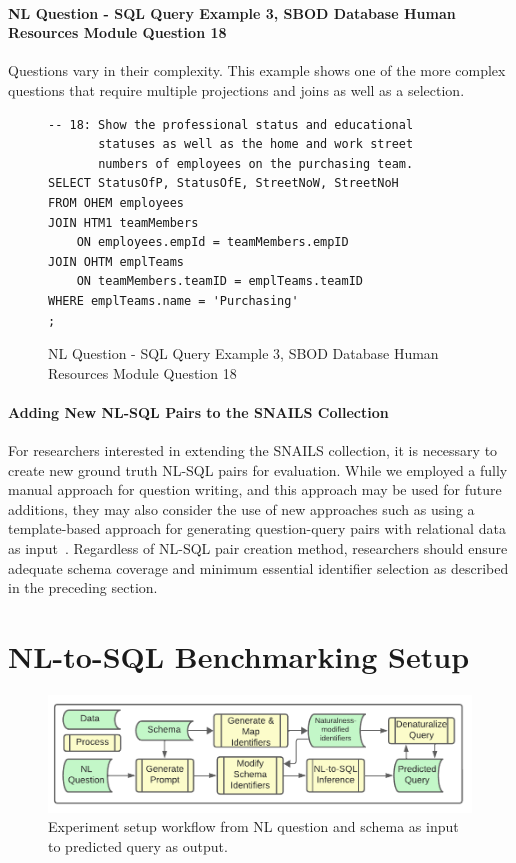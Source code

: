 \paragraph{NL Question - SQL Query Example 3, SBOD Database Human Resources Module Question 18}
Questions vary in their complexity.
This example shows one of the more complex questions that require multiple projections and joins as well as a selection.

\begin{figure}[H]
\begin{Verbatim}[frame=single,fillcolor=\color{lightgray}]
-- 18: Show the professional status and educational 
       statuses as well as the home and work street 
       numbers of employees on the purchasing team.
SELECT StatusOfP, StatusOfE, StreetNoW, StreetNoH
FROM OHEM employees
JOIN HTM1 teamMembers 
    ON employees.empId = teamMembers.empID
JOIN OHTM emplTeams 
    ON teamMembers.teamID = emplTeams.teamID
WHERE emplTeams.name = 'Purchasing'
;
\end{Verbatim}
\caption{NL Question - SQL Query Example 3, SBOD Database Human Resources Module Question 18}
\end{figure}


\paragraph{\textbf{Adding New NL-SQL Pairs to the SNAILS Collection}}
For researchers interested in extending the SNAILS collection, it is necessary to create new ground truth NL-SQL pairs for evaluation. 
While we employed a fully manual approach for question writing, and this approach may be used for future additions, they may also consider the use of new approaches such as using a template-based approach for generating question-query pairs with relational data as input~\cite{10.5555/3666122.3667470}.
Regardless of NL-SQL pair creation method, researchers should ensure adequate schema coverage and minimum essential identifier selection as described in the preceding section.


\section{NL-to-SQL Benchmarking Setup}

\label{section:nl-to-sql-benchmarking-setup}

\begin{figure}[!h]
  \centering
  \includegraphics[width=\figwidthmod\linewidth]{figures/section-5-process-header.pdf}
  \caption{Experiment setup workflow from NL question and schema as input to predicted query as output.}
  \label{fig:section-5-process-header}
\end{figure}

